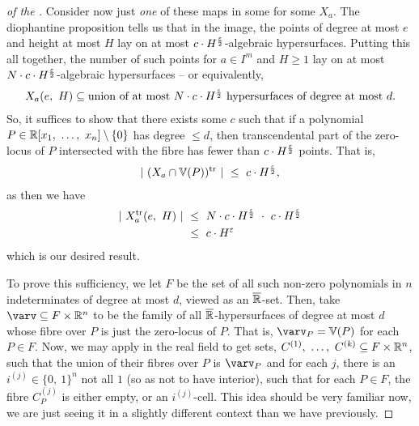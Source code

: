 \begin{proof}[of the \pwT]
  Consider now just \emph{one} of these maps in some \cellrparam for some $X_a$. The diophantine proposition tells us that in the image, the points of degree at most $e$ and height at most $H$ lay on at most $c \cdot H^{\frac{\varepsilon}{2}}$-algebraic hypersurfaces. Putting this all together, the number of such points for $a \in I^m$ and $H \geq 1$ lay on at most $N \cdot c \cdot H^{\frac{\varepsilon}{2}}$-algebraic hypersurfaces -- or equivalently,
    \begin{align*}
      X_a(e, \ H) \subseteq \textrm{union of at most } N \cdot c \cdot H^{\frac{\varepsilon}{2}} \textrm{ hypersurfaces of degree at most } d.
    \end{align*}
    So, it suffices to show that there exists some $c$ such that if a polynomial $P \in \R[x_1, \ \hdots, \ x_n] \setminus \zeroset$ has degree $\leq d$, then transcendental part of the zero-locus of $P$ intersected with the fibre has fewer than $c \cdot H^{\frac{\varepsilon}{2}}$ points. That is, 
    \begin{align*}
      \vert \ (X_a \cap \mathbb{V}(P) )^{\textrm{tr}} \ \vert \ \leq \ c \cdot H^{\frac{\varepsilon}{2}},
    \end{align*} 
    as then we have
    \begin{align*}
      \vert \ X_a^{\textrm{tr}} (e, \ H) \ \vert \ &\leq \ N \cdot c \cdot H^{\frac{\varepsilon}{2}} \ \cdot \ c \cdot H^{\frac{\varepsilon}{2}} \\
                                                &\leq \ c \cdot H^{\varepsilon}
    \end{align*}
    which is our desired result.
    
    To prove this sufficiency, we let $F$ be the set of all such non-zero polynomials in $n$ indeterminates of degree at most $d$, viewed as an $\overline{\mathbb{R}}$- set. Then, take $\varv \subseteq F \times \R^n$ to be the family of all $\overline{\mathbb{R}}$- hypersurfaces of degree at most $d$ whose fibre over $P$ is just the zero-locus of $P$. That is, $\varv_P = \mathbb{V}(P)$ for each $P \in F$. Now, we may apply \cd in the real field to get \sa sets, $C^{(1)}, \ \hdots , \ C^{(k)} \subseteq F \times \mathbb{R}^n$, such that the union of their fibres over $P$ is $\varv_P$ and for each $j$, there is an $i^{(j)} \in \{0, \ 1\}^n$ not all $1$ (so as not to have interior), such that for each $P \in F$, the fibre $C^{(j)}_P$ is either empty, or an $i^{(j)}$-cell. This idea should be very familiar now, we are just seeing it in a slightly different context than we have previously. 
    

\end{proof}
